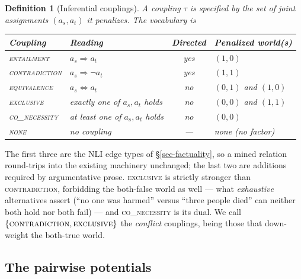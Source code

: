\documentclass{article} %
\newtheorem{definition}{Definition}
\newcommand{\coupling}[1]{\textsc{#1}}          %
\begin{document}
\begin{definition}[Inferential couplings]
\label{def-couplings}
A coupling $\tau$ is specified by the set of joint assignments $(a_s,a_t)$ it penalizes.
The vocabulary is
\begin{center}\small
\begin{tabular}{@{}llcl@{}}
\toprule
Coupling & Reading & Directed & Penalized world(s) \\
\midrule
\coupling{entailment}   & $a_s \Rightarrow a_t$              & yes & $(1,0)$ \\
\coupling{contradiction}& $a_s \Rightarrow \neg a_t$         & yes & $(1,1)$ \\
\coupling{equivalence}  & $a_s \Leftrightarrow a_t$          & no  & $(0,1)$ and $(1,0)$ \\
\coupling{exclusive}    & exactly one of $a_s,a_t$ holds     & no  & $(0,0)$ and $(1,1)$ \\
\coupling{co\_necessity}& at least one of $a_s,a_t$ holds    & no  & $(0,0)$ \\
\coupling{none}         & no coupling                        & --- & none (no factor) \\
\bottomrule
\end{tabular}
\end{center}
\end{definition}

The first three are the NLI edge types of \S\ref{sec-factuality}, so a mined relation round-trips
into the existing machinery unchanged; the last two are additions required by argumentative prose.
\coupling{exclusive} is strictly stronger than \coupling{contradiction}, forbidding the both-false
world as well --- what \emph{exhaustive} alternatives assert (``no one was harmed'' versus ``three
people died'' can neither both hold nor both fail) --- and \coupling{co\_necessity} is its dual. We
call $\{\coupling{contradiction},\coupling{exclusive}\}$ the \emph{conflict} couplings, being
those that down-weight the both-true world.

\subsection{The pairwise potentials}
\label{sec-potentials}
\end{document}
